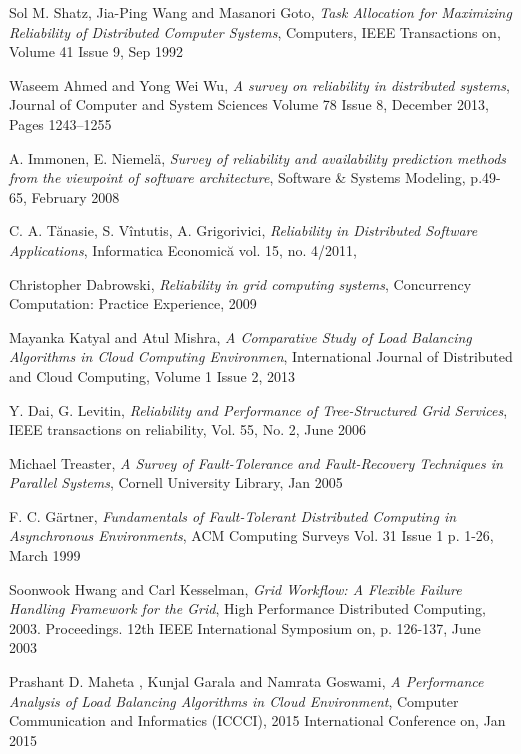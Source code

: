 \documentclass{cslthse-msc}
\begin{document}
\begin{thebibliography}{50}

	Sol M. Shatz, Jia-Ping Wang and Masanori Goto,
	\emph{Task Allocation for Maximizing Reliability of Distributed Computer Systems},
	Computers, IEEE Transactions on, Volume 41  Issue 9,
	Sep 1992
	
	Waseem Ahmed and Yong Wei Wu,
	\emph{A survey on reliability in distributed systems},
	Journal of Computer and System Sciences Volume 78 Issue 8,
	December 2013, Pages 1243–1255
	
	A. Immonen, E. Niemelä,
	\emph{Survey of reliability and availability prediction methods from the viewpoint of software architecture},
	Software \& Systems Modeling, p.49-65,
	February 2008

	C. A. Tănasie, S. Vîntutis, A. Grigorivici,
	\emph{Reliability in Distributed Software Applications},
	Informatica Economică vol. 15, no. 4/2011,

	Christopher Dabrowski,
	\emph{Reliability in grid computing systems},
	Concurrency Computation: Practice Experience,
	2009

	Mayanka Katyal and Atul Mishra,
	\emph{A Comparative Study of Load Balancing Algorithms in Cloud Computing Environmen},
	International Journal of Distributed and Cloud Computing, Volume 1 Issue 2,
	2013
	
	Y. Dai, G. Levitin,
	\emph{Reliability and Performance of Tree-Structured Grid Services},
	IEEE transactions on reliability, Vol. 55, No. 2, 
	June 2006

	Michael Treaster,
	\emph{A Survey of Fault-Tolerance and Fault-Recovery Techniques in Parallel Systems},
	Cornell University Library,
	Jan 2005

	F. C. Gärtner,
	\emph{Fundamentals of Fault-Tolerant Distributed Computing in Asynchronous Environments},
	ACM Computing Surveys Vol. 31 Issue 1 p. 1-26, 
	March 1999 

	Soonwook Hwang and Carl Kesselman,
	\emph{Grid Workflow: A Flexible Failure Handling Framework for the Grid},
	High Performance Distributed Computing, 2003. Proceedings. 12th IEEE International Symposium on, p. 	126-137, 
	June 2003

	Prashant D. Maheta , Kunjal Garala and Namrata Goswami,
	\emph{A Performance Analysis of Load Balancing Algorithms in Cloud Environment},
	Computer Communication and Informatics (ICCCI), 2015 International Conference on,
	Jan 2015
	

\end{thebibliography}
\end{document}
